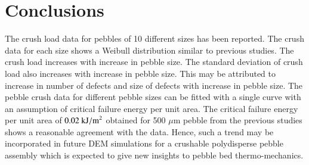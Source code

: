 \section{Conclusions}\label{sec:conclusions}
The crush load data for pebbles of 10 different sizes has been reported. The crush data for each size shows a Weibull distribution similar to previous studies. The crush load increases with increase in pebble size. The standard deviation of crush load also increases with increase in pebble size. This may be attributed to increase in number of defects and size of defects with increase in pebble size. The pebble crush data for different pebble sizes can be fitted with a single curve with an assumption of critical failure energy per unit area. The critical failure energy per unit area of $0.02~\rm{kJ/m}^2$ obtained for 500 $\mu$m pebble from the previous studies shows a reasonable agreement with the data. Hence, such a trend may be incorporated in future DEM simulations for a crushable polydisperse pebble assembly which is expected to give new insights to pebble bed thermo-mechanics.

